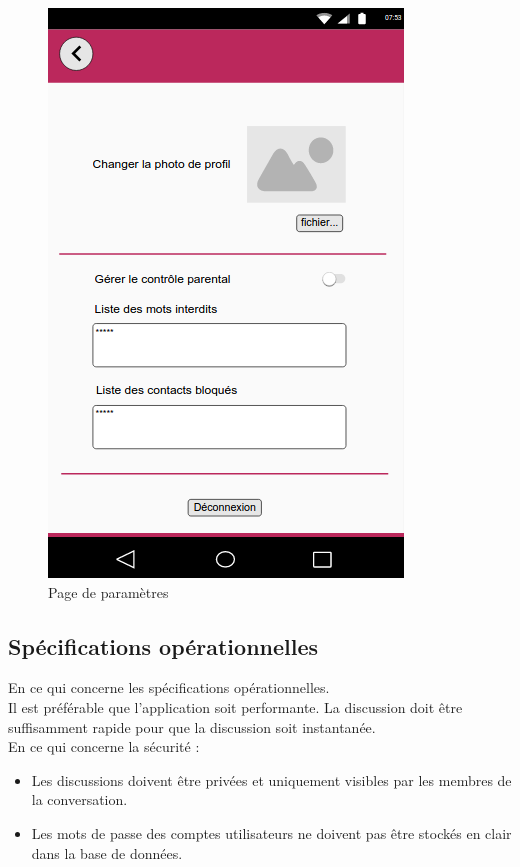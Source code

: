 	\begin{figure}[H]
		\centering \includegraphics[scale=0.5]{img/Parametres.png}
		\caption{Page de paramètres}
	\end{figure}
	
	
\subsection{Spécifications opérationnelles}

En ce qui concerne les spécifications opérationnelles. \\

Il est préférable que l'application soit performante. La discussion doit être suffisamment rapide pour que la discussion soit instantanée. \\

En ce qui concerne la sécurité : \\

\begin{itemize}
	\item Les discussions doivent être privées et uniquement visibles par les membres de la conversation. 
	\item Les mots de passe des comptes utilisateurs ne doivent pas être stockés en clair dans la base de données.
\end{itemize}




